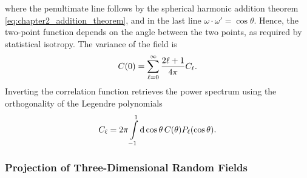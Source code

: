 %
where the penultimate line follows by the spherical harmonic addition theorem \cref{eq:chapter2_addition_theorem}, and in the last line \({\omega\cdot\omega' = \cos{\theta}}\).
Hence, the two-point function depends on the angle between the two points, as required by statistical isotropy.
The variance of the field is
%
\begin{equation}
	C(0)
	= \sum\limits_{\ell=0}^{\infty} \frac{2\ell+1}{4\pi} C_{\ell}.
\end{equation}
%
Inverting the correlation function retrieves the power spectrum using the orthogonality of the Legendre polynomials
%
\begin{equation}
	C_{\ell}
	= 2\pi \int\limits_{-1}^{1} \dd{\cos{\theta}} C(\theta) P_{\ell}(\cos{\theta}).
\end{equation}

\subsubsection{Projection of Three-Dimensional Random Fields}

